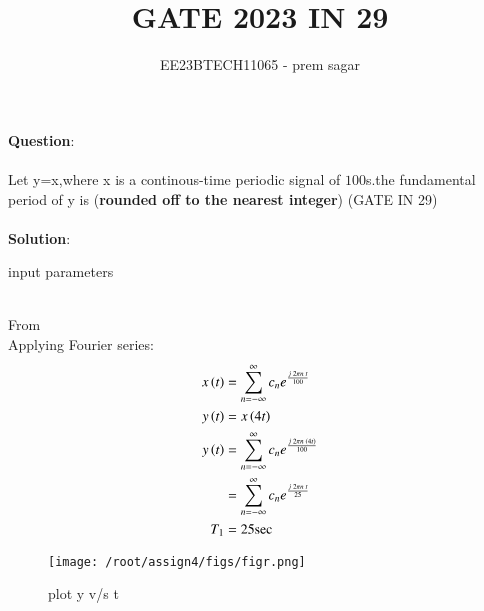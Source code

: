 \documentclass[journal,12pt,twocolumn]{IEEEtran}
\theoremstyle{remark}
\begin{document}

\vspace{3cm}

\title{GATE 2023 IN 29}
\author{EE23BTECH11065 - prem sagar}
\maketitle
\newpage

\bigskip 

\renewcommand{\thefigure}{\theenumi}
\renewcommand{\thetable}{\theenumi}
\textbf{Question}:
\\\\Let y=x,where x is a continous-time periodic signal of $100$s.the fundamental period of y is (\textbf{rounded off to the nearest integer})
 \hfill(GATE IN 29)
 \\\\\textbf{Solution}:
\begin{table}[!ht]
\def\arraystretch{1.5}
   \centering
    \renewcommand\thetable{1}
      
    \caption{input parameters}
    \label{tab:IN 29}
 \end{table}
\\From {}
\\Applying Fourier series:
 \begin{align}
 x\left(t\right)&=\sum_{n=-\infty}^{\infty}c_ne^\frac{j\;2\pi n\;t}{100}
\\ y\left(t\right)&=x\left(4t\right)
\\ y\left(t\right)&=\sum_{n=-\infty}^{\infty}c_ne^\frac{j\;2\pi n\;\left(4t\right)}{100}
\\&=\sum_{n=-\infty}^{\infty}c_ne^\frac{j\;2\pi n\;t}{25}
\\T_1&=25\text{sec}
 \end{align}
\begin{figure}[h]
 \renewcommand\thefigure{1}
    \centering
    \texttt{[image: /root/assign4/figs/figr.png]}
    \caption{plot y v/s t}
    \label{fig:enter-label}
\end{figure}
\end{document}
